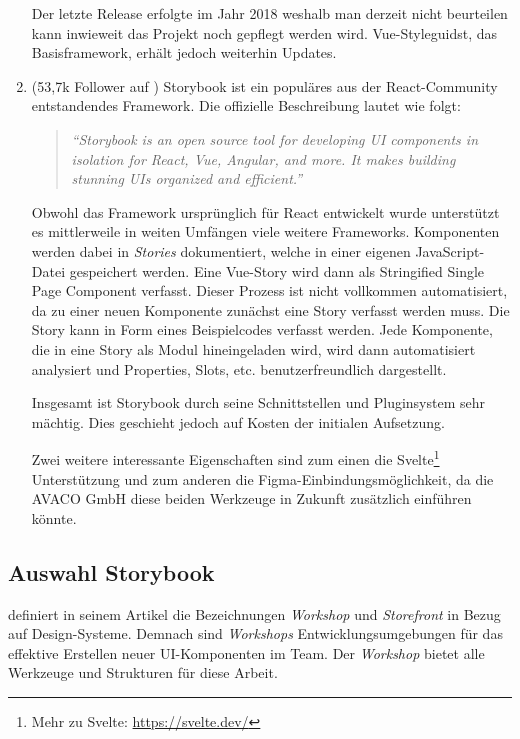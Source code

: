 \begin{enumerate}
    Der letzte Release erfolgte im Jahr 2018 weshalb man derzeit nicht beurteilen kann inwieweit das Projekt noch gepflegt werden wird. Vue-Styleguidst, das Basisframework, erhält jedoch weiterhin Updates.
    \item \textbf{} (53,7k Follower auf \cite{StorybookGithub})\newline
    Storybook ist ein populäres aus der React-Community entstandendes Framework. Die offizielle Beschreibung lautet wie folgt:

    \begin{quotation}
        \emph{``Storybook is an open source tool for developing UI components in isolation for React, Vue, Angular, and more. It makes building stunning UIs organized and efficient.''} \citep{Storybook}
    \end{quotation}

    Obwohl das Framework ursprünglich für React entwickelt wurde unterstützt es mittlerweile in weiten Umfängen viele weitere Frameworks. Komponenten werden dabei in \textit{Stories} dokumentiert, welche in einer eigenen JavaScript-Datei gespeichert werden. Eine Vue-Story wird dann als Stringified Single Page Component verfasst. Dieser Prozess ist nicht vollkommen automatisiert, da zu einer neuen Komponente zunächst eine Story verfasst werden muss. Die Story kann in Form eines Beispielcodes verfasst werden. Jede Komponente, die in eine Story als Modul hineingeladen wird, wird dann automatisiert analysiert und Properties, Slots, etc. benutzerfreundlich dargestellt.

    Insgesamt ist Storybook durch seine Schnittstellen und Pluginsystem sehr mächtig. Dies geschieht jedoch auf Kosten der initialen Aufsetzung.

    Zwei weitere interessante Eigenschaften sind zum einen die Svelte\footnote{ Mehr zu Svelte: \url{https://svelte.dev/} } Unterstützung und zum anderen die Figma-Einbindungsmöglichkeit, da die AVACO GmbH diese beiden Werkzeuge in Zukunft zusätzlich einführen könnte.
\end{enumerate}

\subsection{Auswahl Storybook}
\cite{WorkshopStorefront} definiert in seinem Artikel die Bezeichnungen \textit{Workshop} und \textit{Storefront} in Bezug auf Design-Systeme. Demnach sind \textit{Workshops} Entwicklungsumgebungen für das effektive Erstellen neuer UI-Komponenten im Team. Der \textit{Workshop} bietet alle Werkzeuge und Strukturen für diese Arbeit.

